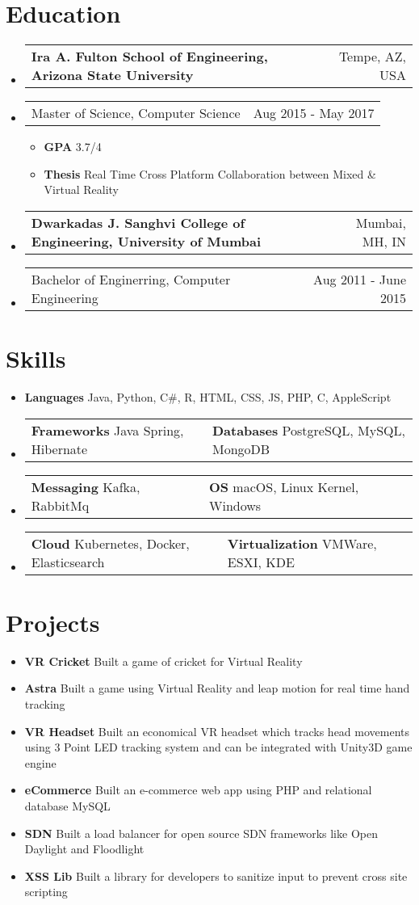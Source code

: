 \documentclass[a4paper,12pt]{article} %
\makeatletter
\newcommand\tableVerticalSpace{-1em}
\newcommand\tableItemVerticalSpace{-1em}
\newcommand\zeroSpacing{0em}
\newcommand\sectionSpacing{0.5em}
\newcommand{\fourElementListStart}{\begin{itemize}[label={},leftmargin=*]\setlength\itemsep{0.3em}}
\newcommand{\fourElementListEnd}{\end{itemize}\vspace{\zeroSpacing}}
\newcommand{\generalListStart}{\vspace{-0.5em}\begin{itemize}[leftmargin=2em]\setlength\itemsep{-0.4em}}
\newcommand{\generalListEnd}{\end{itemize}\vspace{\zeroSpacing}}
\newcommand{\generalSubListStart}{\vspace{-1em}\begin{itemize}[leftmargin=2em]\setlength\itemsep{-0.2em}}
\newcommand{\generalSubListEnd}{\end{itemize}\vspace{\zeroSpacing}}
\newcommand{\institutionItem}[2]{
	\vspace{\tableItemVerticalSpace}\item
		\begin{tabular*}{\textwidth}{@{}l@{\extracolsep{\fill}}r@{}}
			\textbf{#1} & {\small{#2}} \\[\zeroSpacing]
		\end{tabular*}\vspace{\tableVerticalSpace}
}
\newcommand{\twoElementItem}[2]{
	\vspace{\tableItemVerticalSpace}\item
		\begin{tabular*}{\textwidth}{@{}l@{\extracolsep{\fill}}r@{}}
			{#1} & {\small{#2}} \\[\zeroSpacing]
		\end{tabular*}\vspace{\tableVerticalSpace}
}
\newcommand{\twoKeyValuePairElementItem}[4]{
	\vspace{\tableItemVerticalSpace}\item
		\begin{tabular}{@{}p{7cm}p{11cm}}

			\vspace{0.5em}\textbf{#1}{ #2} & \vspace{0.5em}\textbf{#3}{ #4}

		\end{tabular}\vspace{\tableVerticalSpace}
}
\newcommand{\oneKeyValuePairElement}[2]{
	\item \textbf{#1}{ #2}
}
\makeatother
\begin{document}
\vspace{\sectionSpacing}\section*{Education}

\fourElementListStart
	\institutionItem {Ira A. Fulton School of Engineering, Arizona State University}{Tempe, AZ, USA}
	\twoElementItem {Master of Science, Computer Science}{Aug 2015 - May 2017}
	\generalSubListStart
		\item \textbf{GPA} 3.7/4
		\item \textbf{Thesis} Real Time Cross Platform Collaboration between Mixed \& Virtual Reality
	\generalSubListEnd
	\institutionItem {Dwarkadas J. Sanghvi College of Engineering, University of Mumbai}{Mumbai, MH, IN}
	\twoElementItem {Bachelor of Enginerring, Computer Engineering}{Aug 2011 - June 2015}
\fourElementListEnd


\vspace{\sectionSpacing}\section*{Skills}

\generalListStart
	\oneKeyValuePairElement{Languages}{Java, Python, C\#, R, HTML, CSS, JS, PHP, C, AppleScript}
	\twoKeyValuePairElementItem{Frameworks}{Java Spring, Hibernate}{Databases}{PostgreSQL, MySQL, MongoDB}
	\vspace{-0.5em}\twoKeyValuePairElementItem{Messaging}{Kafka, RabbitMq}{OS}{macOS, Linux Kernel, Windows}
	\vspace{-0.5em}\twoKeyValuePairElementItem{Cloud}{Kubernetes, Docker, Elasticsearch}{Virtualization}{VMWare, ESXI, KDE}
\generalListEnd


\vspace{\sectionSpacing}\section*{Projects}
\generalListStart
	\oneKeyValuePairElement{VR Cricket}{Built a game of cricket for Virtual Reality}
	\oneKeyValuePairElement{Astra}{Built a game using Virtual Reality and leap motion for real time hand tracking}
	\oneKeyValuePairElement{VR Headset}{Built an economical VR headset which tracks head movements using 3 Point LED tracking system and can be integrated with Unity3D game engine}
	\oneKeyValuePairElement{eCommerce}{Built an e-commerce web app using PHP and relational database MySQL}
	\oneKeyValuePairElement{SDN}{Built a load balancer for open source SDN frameworks like Open Daylight and Floodlight}
	\oneKeyValuePairElement{XSS Lib}{Built a library for developers to sanitize input to prevent cross site scripting}\vspace{-1em}
\generalListEnd
\end{document}
